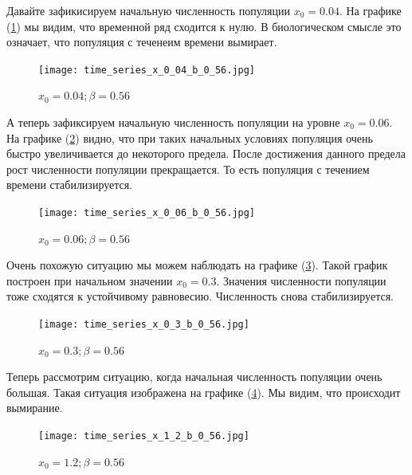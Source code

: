         Давайте зафикисируем начальную численность популяции \(x_0 = 0.04\). На графике (\ref{time_series_x_0_04_b_0_56}) мы видим, что временной ряд сходится к нулю. В биологическом смысле это означает, что популяция с теченеим времени вымирает.
    
        \begin{figure}
            \centering
            \texttt{[image: time\_series\_x\_0\_04\_b\_0\_56.jpg]}

            \captionsetup{justification=centering}
            \caption{\(x_0 = 0.04; \beta = 0.56\)}
            \label{time_series_x_0_04_b_0_56}
        \end{figure}

        А теперь зафиксируем начальную численность популяции на уровне \(x_0 = 0.06\). На графике (\ref{time_series_x_0_06_b_0_56}) видно, что при таких начальных условиях популяция очень быстро увеличивается до некоторого предела. После достижения данного предела рост численности популяции прекращается. То есть популяция с течением времени стабилизируется.
    
        \begin{figure}
            \centering
            \texttt{[image: time\_series\_x\_0\_06\_b\_0\_56.jpg]}

            \captionsetup{justification=centering}
            \caption{\(x_0 = 0.06; \beta = 0.56\)}
            \label{time_series_x_0_06_b_0_56}
        \end{figure}

        Очень похожую ситуацию мы можем наблюдать на графике (\ref{time_series_x_0_3_b_0_56}). Такой график построен при начальном значении \(x_0 = 0.3\). Значения численности популяции тоже сходятся к устойчивому равновесию. Численность снова стабилизируется.
    
        \begin{figure}
            \centering
            \texttt{[image: time\_series\_x\_0\_3\_b\_0\_56.jpg]}

            \captionsetup{justification=centering}
            \caption{\(x_0 = 0.3; \beta = 0.56\)}
            \label{time_series_x_0_3_b_0_56}
        \end{figure}

        Теперь рассмотрим ситуацию, когда начальная численность популяции очень большая. Такая ситуация изображена на графике (\ref{time_series_x_1_2_b_0_56}). Мы видим, что происходит вымирание.
    
        \begin{figure}
            \centering
            \texttt{[image: time\_series\_x\_1\_2\_b\_0\_56.jpg]}

            \captionsetup{justification=centering}
            \caption{\(x_0 = 1.2; \beta = 0.56\)}
            \label{time_series_x_1_2_b_0_56}
        \end{figure}

